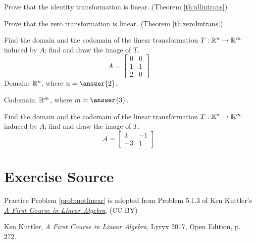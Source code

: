 \documentclass{ximera}
\begin{document}
\begin{problem}\label{prob:idtrans} Prove that the identity transformation is linear. (Theorem \ref{th:idlintrans})\end{problem}

\begin{problem}\label{prob:zerotrans} Prove that the zero transformation is linear. (Theorem \ref{th:zerolintrans})\end{problem}

  \begin{problem}\label{prob:domaincodomain1} Find the domain and the codomain of the linear transformation $T:\mathbb{R}^n\rightarrow\mathbb{R}^m$ induced by $A$; find and draw the image of $T$.
  $$A=\begin{bmatrix}0&0\\1&1\\2&0\end{bmatrix}$$
  Domain: $\mathbb{R}^n$, where $n=\answer{2}$.

  Codomain: $\mathbb{R}^m$, where $m=\answer{3}$.
  \end{problem}
  
  \begin{problem}\label{prob:domaincodomain2} Find the domain and the codomain of the linear transformation $T:\mathbb{R}^n\rightarrow\mathbb{R}^m$ induced by $A$; find and draw the image of $T$.
  $$A=\begin{bmatrix}3&-1\\-3&1\end{bmatrix}$$
   \end{problem}


\section*{Exercise Source}
Practice Problem \ref{prob:notlinear} is adopted from Problem 5.1.3 of Ken Kuttler's \href{https://open.umn.edu/opentextbooks/textbooks/a-first-course-in-linear-algebra-2017}{\it A First Course in Linear Algebra}. (CC-BY)

Ken Kuttler, {\it  A First Course in Linear Algebra}, Lyryx 2017, Open Edition, p. 272.
\end{document}
